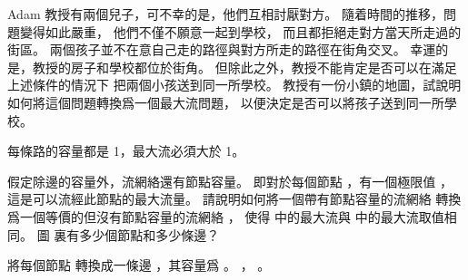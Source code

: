 \startEXERCISE
Adam 教授有兩個兒子，可不幸的是，他們互相討厭對方。
隨着時間的推移，問題變得如此嚴重，
他們不僅不願意一起到學校，
而且都拒絕走對方當天所走過的街區。
兩個孩子並不在意自己走的路徑與對方所走的路徑在街角交叉。
幸運的是，教授的房子和學校都位於街角。
但除此之外，教授不能肯定是否可以在滿足上述條件的情況下
把兩個小孩送到同一所學校。
教授有一份小鎮的地圖，試說明如何將這個問題轉換爲一個最大流問題，
以便決定是否可以將孩子送到同一所學校。
\stopEXERCISE

\startANSWER
每條路的容量都是 1，最大流必須大於 1。
\stopANSWER

\startEXERCISE
假定除邊的容量外，流網絡還有{\EMP 節點容量}。
即對於每個節點 ，有一個極限值 ，
這是可以流經此節點的最大流量。
請說明如何將一個帶有節點容量的流網絡  轉換
爲一個等價的但沒有節點容量的流網絡 ，
使得  中的最大流與  中的最大流取值相同。
圖  裏有多少個節點和多少條邊？
\stopEXERCISE

\startANSWER
將每個節點  轉換成一條邊 ，其容量爲 。
 ， 。
\stopANSWER

\stopsection
